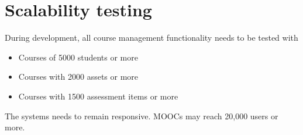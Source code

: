 \section{Scalability testing}
During development, all course management functionality needs to be tested with
\begin{itemize}
\item Courses of 5000 students or more
\item Courses with 2000 assets or more
\item Courses with 1500 assessment items or more
\end{itemize}
The systems needs to remain responsive. MOOCs may reach 20,000 users or more.
